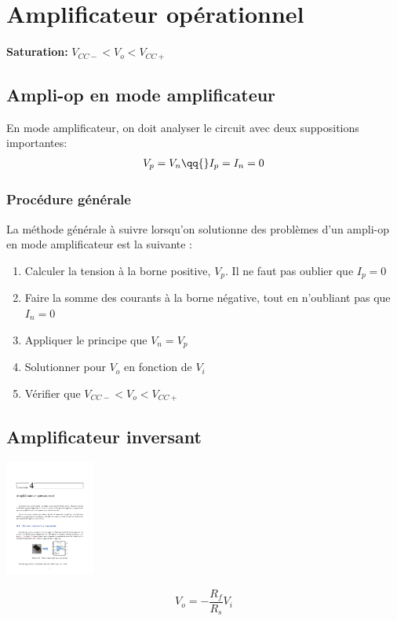 \section{Amplificateur opérationnel}
\textbf{Saturation:} \hspace{1.25cm}\( V_{CC-} < V_o < V_{CC+} \)

\subsection{Ampli-op en mode amplificateur}
En mode amplificateur, on doit analyser le circuit avec deux suppositions importantes:
\begin{gather*}
    V_p = V_n\qq{} I_p = I_n = 0
\end{gather*}
\subsubsection{Procédure générale}
La méthode générale à suivre lorsqu’on solutionne des problèmes d’un ampli-op en mode amplificateur est la suivante :
\begin{enumerate}
    \item Calculer la tension à la borne positive, $V_p$. Il ne faut pas oublier que $I_p = 0$
    \item Faire la somme des courants à la borne négative, tout en n’oubliant pas que $I_n = 0$
    \item Appliquer le principe que $V_n = V_p$
    \item Solutionner pour $V_o$ en fonction de $V_i$
    \item Vérifier que $V_{CC-} < V_o < V_{CC+}$
\end{enumerate}

\subsection{Amplificateur inversant}
\begin{multicols*}{2}
\centering
\includegraphics[trim={2.5in 6.25in 2.5in 3in}, clip=true,page=4,height=1.5in]{fig/fig.pdf}

\begin{equation*}
    V_o = -\frac{R_f}{R_s}V_i
\end{equation*}
\end{multicols*}



